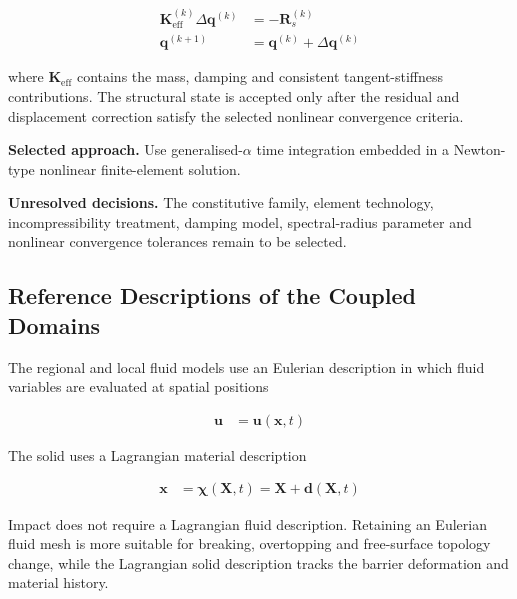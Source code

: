 \begin{align}
\bm{K}_{\mathrm{eff}}^{(k)}
\Delta\bm{q}^{(k)}
&=
-\bm{R}_{s}^{(k)}
\label{eq:res_str_sim_newton_correction}
\\
\bm{q}^{(k+1)}
&=
\bm{q}^{(k)}
+
\Delta\bm{q}^{(k)}
\label{eq:res_str_sim_newton_update}
\end{align}

where \(\bm{K}_{\mathrm{eff}}\) contains the mass, damping and consistent tangent-stiffness contributions. The structural state is accepted only after the residual and displacement correction satisfy the selected nonlinear convergence criteria.

\textbf{Selected approach.} Use generalised-\(\alpha\) time integration embedded in a Newton-type nonlinear finite-element solution.

\textbf{Unresolved decisions.} The constitutive family, element technology, incompressibility treatment, damping model, spectral-radius parameter and nonlinear convergence tolerances remain to be selected.



\subsection{Reference Descriptions of the Coupled Domains}
\label{subsec:res_str_fsi_reference_descriptions}

The regional and local fluid models use an Eulerian description in which fluid variables are evaluated at spatial positions

\begin{align}
\bm{u}
&=
\bm{u}\!\left(\bm{x},t\right)
\label{eq:res_str_fsi_eulerian_velocity}
\end{align}

The solid uses a Lagrangian material description

\begin{align}
\bm{x}
&=
\bm{\chi}\!\left(\bm{X},t\right)
=
\bm{X}
+
\bm{d}\!\left(\bm{X},t\right)
\label{eq:res_str_fsi_lagrangian_motion}
\end{align}

Impact does not require a Lagrangian fluid description. Retaining an Eulerian fluid mesh is more suitable for breaking, overtopping and free-surface topology change, while the Lagrangian solid description tracks the barrier deformation and material history.

